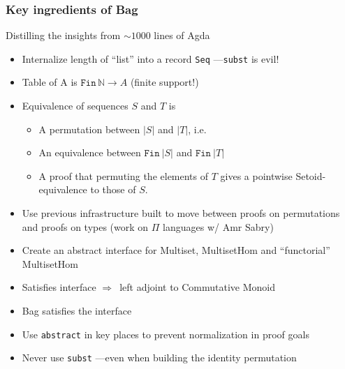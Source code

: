 \documentclass[serif,mathserif,professionalfont,10pt]{beamer}
\begin{document}
\begin{frame}
\frametitle{Key ingredients of Bag}
Distilling the insights from $\sim \! 1000$ lines of Agda \pause
\begin{itemize}
\item<1-> Internalize length of ``list'' into a record \texttt{Seq} ---\texttt{subst} is evil!
\item<2-> Table of A is $\texttt{Fin}\, \mathbb{N} \rightarrow A$ (finite
  support!)
\item<3-> Equivalence of sequences $S$ and $T$ is
\begin{itemize}
\item<4-> A permutation between $|S|$ and $|T|$, i.e.
\item<5-> An equivalence between $\texttt{Fin}~ |S|$ and $\texttt{Fin}~ |T|$
\item<6-> A proof that permuting the elements of $T$ gives a
pointwise Setoid-equivalence to those of $S$.
\end{itemize}
\item<7-> Use previous infrastructure built to move between proofs
on permutations and proofs on types (work on $\Pi$ languages
w/ Amr Sabry)
\item<8-> Create an abstract interface for Multiset, MultisetHom and 
``functorial'' MultisetHom
\item<9-> Satisfies interface $\Rightarrow$\ left
adjoint to Commutative Monoid
\item<10-> Bag satisfies the interface
\item<11-> Use \texttt{abstract} in key places to prevent normalization
in proof goals
\item<12-> Never use \texttt{subst} ---even when building the identity permutation
\end{itemize}
\end{frame}
\end{document}
